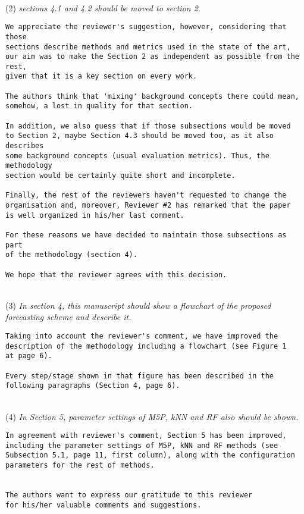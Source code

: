 \documentclass[preprint]{elsarticle}
\begin{document}
~\\
\noindent (2) \emph{sections 4.1 and 4.2 should be moved to section 2. } 

\begin{verbatim}
We appreciate the reviewer's suggestion, however, considering that those 
sections describe methods and metrics used in the state of the art, 
our aim was to make the Section 2 as independent as possible from the rest, 
given that it is a key section on every work. 

The authors think that 'mixing' background concepts there could mean, 
somehow, a lost in quality for that section.

In addition, we also guess that if those subsections would be moved 
to Section 2, maybe Section 4.3 should be moved too, as it also describes 
some background concepts (usual evaluation metrics). Thus, the methodology 
section would be certainly quite short and incomplete.

Finally, the rest of the reviewers haven't requested to change the 
organisation and, moreover, Reviewer #2 has remarked that the paper 
is well organized in his/her last comment.

For these reasons we have decided to maintain those subsections as part
of the methodology (section 4).

We hope that the reviewer agrees with this decision.
\end{verbatim}


~\\
\noindent (3) \emph{In section 4, this manuscript should show a flowchart of the proposed forecasting scheme and describe it. } 

\begin{verbatim}
Taking into account the reviewer's comment, we have improved the 
description of the methodology including a flowchart (see Figure 1 
at page 6).

Every step/stage shown in that figure has been described in the 
following paragraphs (Section 4, page 6).
\end{verbatim}


~\\
\noindent (4) \emph{In Section 5, parameter settings of 
M5P, kNN and RF also should be shown. } 

\begin{verbatim}
In agreement with reviewer's comment, Section 5 has been improved, 
including the parameter settings of M5P, kNN and RF methods (see 
Subsection 5.1, page 11, first column), along with the configuration 
parameters for the rest of methods.


The authors want to express our gratitude to this reviewer 
for his/her valuable comments and suggestions.
\end{verbatim}
\end{document}
